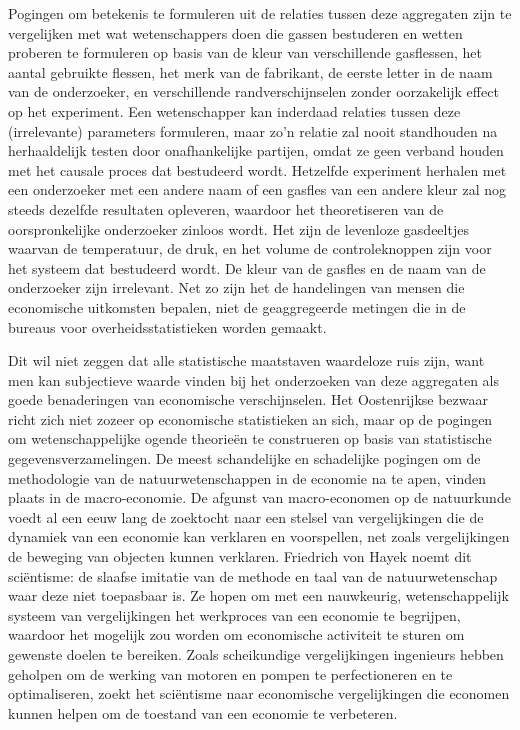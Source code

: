 Pogingen om betekenis te formuleren uit de relaties tussen deze aggregaten zijn te vergelijken met wat wetenschappers doen die gassen bestuderen en wetten proberen te formuleren op basis van de kleur van verschillende gasflessen, het aantal gebruikte flessen, het merk van de fabrikant, de eerste letter in de naam van de onderzoeker, en verschillende randverschijnselen zonder oorzakelijk effect op het experiment. Een wetenschapper kan inderdaad relaties tussen deze (irrelevante) parameters formuleren, maar zo’n relatie zal nooit standhouden na herhaaldelijk testen door onafhankelijke partijen, omdat ze geen verband houden met het causale proces dat bestudeerd wordt. Hetzelfde experiment herhalen met een onderzoeker met een andere naam of een gasfles van een andere kleur zal nog steeds dezelfde resultaten opleveren, waardoor het theoretiseren van de oorspronkelijke onderzoeker zinloos wordt. Het zijn de levenloze gasdeeltjes waarvan de temperatuur, de druk, en het volume de controleknoppen zijn voor het systeem dat bestudeerd wordt. De kleur van de gasfles en de naam van de onderzoeker zijn irrelevant. Net zo zijn het de handelingen van mensen die economische uitkomsten bepalen, niet de geaggregeerde metingen die in de bureaus voor overheidsstatistieken worden gemaakt.

Dit wil niet zeggen dat alle statistische maatstaven waardeloze ruis zijn, want men kan subjectieve waarde vinden bij het onderzoeken van deze aggregaten als goede benaderingen van economische verschijnselen. Het Oostenrijkse bezwaar richt zich niet zozeer op economische statistieken an sich, maar op de pogingen om wetenschappelijke ogende theorieën te construeren op basis van statistische gegevensverzamelingen. De meest schandelijke en schadelijke pogingen om de methodologie van de natuurwetenschappen in de economie na te apen, vinden plaats in de macro-economie. De afgunst van macro-economen op de natuurkunde voedt al een eeuw lang de zoektocht naar een stelsel van vergelijkingen die de dynamiek van een economie kan verklaren en voorspellen, net zoals vergelijkingen de beweging van objecten kunnen verklaren. Friedrich von Hayek noemt dit sciëntisme: de slaafse imitatie van de methode en taal van de natuurwetenschap waar deze niet toepasbaar is.\autocite{10} Ze hopen om met een nauwkeurig, wetenschappelijk systeem van vergelijkingen het werkproces van een economie te begrijpen, waardoor het mogelijk zou worden om economische activiteit te sturen om gewenste doelen te bereiken. Zoals scheikundige vergelijkingen ingenieurs hebben geholpen om de werking van motoren en pompen te perfectioneren en te optimaliseren, zoekt het sciëntisme naar economische vergelijkingen die economen kunnen helpen om de toestand van een economie te verbeteren.

